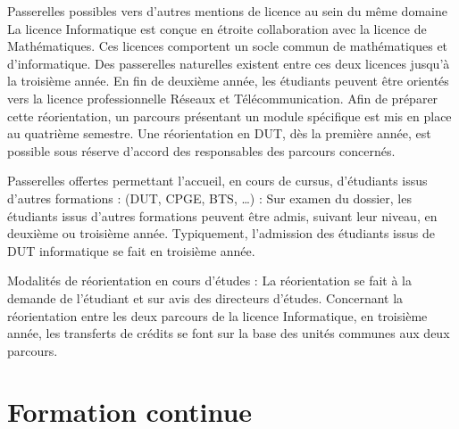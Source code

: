\documentclass[10pt, a5paper]{report}
\begin{document}
\begin{spacing}{1.5}
Passerelles possibles vers d’autres mentions de licence au sein du même domaine
La licence Informatique est  conçue en étroite collaboration avec la licence de Mathématiques. Ces licences comportent un socle commun de mathématiques et d’informatique. Des passerelles naturelles existent entre ces deux licences jusqu'à la troisième année.
En fin de deuxième année, les étudiants peuvent être orientés vers la licence professionnelle Réseaux et Télécommunication. Afin de préparer cette réorientation, un parcours présentant un module spécifique est mis en place au quatrième semestre.
Une réorientation en DUT, dès la première année, est possible sous réserve d'accord des responsables des parcours concernés.

Passerelles offertes permettant l’accueil, en cours de cursus, d’étudiants issus d’autres formations : (DUT, CPGE, BTS, …) :
Sur examen du dossier, les étudiants issus d'autres formations peuvent être admis, suivant leur niveau, en deuxième ou troisième année. Typiquement, l'admission des étudiants issus de DUT informatique se fait en troisième année.

Modalités de réorientation en cours d’études :
La réorientation se fait à la demande de l'étudiant et sur avis des directeurs d'études. Concernant la réorientation entre les deux parcours de la licence Informatique, en troisième année, les transferts de crédits se font sur la base des unités communes aux deux parcours.

\section*{Formation continue}

  \end{spacing}
\end{document}
